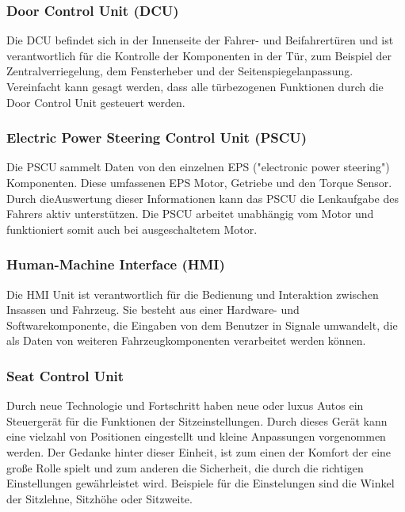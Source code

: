         \subsubsection{Door Control Unit (DCU)}
        Die DCU befindet sich in der Innenseite der Fahrer- und Beifahrertüren und ist verantwortlich für die
        Kontrolle der Komponenten in der Tür, zum Beispiel der Zentralverriegelung, dem Fensterheber und der Seitenspiegelanpassung. 
        Vereinfacht kann gesagt werden, dass alle türbezogenen Funktionen durch die Door Control Unit gesteuert werden.

        \subsubsection{Electric Power Steering Control Unit (PSCU)}
        Die PSCU sammelt Daten von den einzelnen EPS ("electronic power steering") Komponenten. Diese umfassenen EPS Motor,
        Getriebe und den Torque Sensor.\\ Durch dieAuswertung dieser Informationen kann das PSCU die Lenkaufgabe des
        Fahrers aktiv unterstützen. Die PSCU arbeitet unabhängig vom Motor und funktioniert somit auch bei ausgeschaltetem Motor.

        \subsubsection{Human-Machine Interface (HMI)}
        Die HMI Unit ist verantwortlich für die Bedienung und Interaktion zwischen Insassen und Fahrzeug. Sie besteht aus einer
        Hardware- und Softwarekomponente, die Eingaben von dem Benutzer in Signale umwandelt, die als Daten von weiteren Fahrzeugkomponenten
        verarbeitet werden können.

        \subsubsection{Seat Control Unit}
        Durch neue Technologie und Fortschritt haben neue oder luxus Autos ein Steuergerät für die Funktionen der Sitzeinstellungen.
        Durch dieses Gerät kann eine vielzahl von Positionen eingestellt und kleine Anpassungen vorgenommen werden.
        Der Gedanke hinter dieser Einheit, ist zum einen der Komfort der eine große Rolle spielt und zum anderen die Sicherheit,
        die durch die richtigen Einstellungen gewährleistet wird. Beispiele für die Einstelungen sind die Winkel der Sitzlehne,
        Sitzhöhe oder Sitzweite. 

